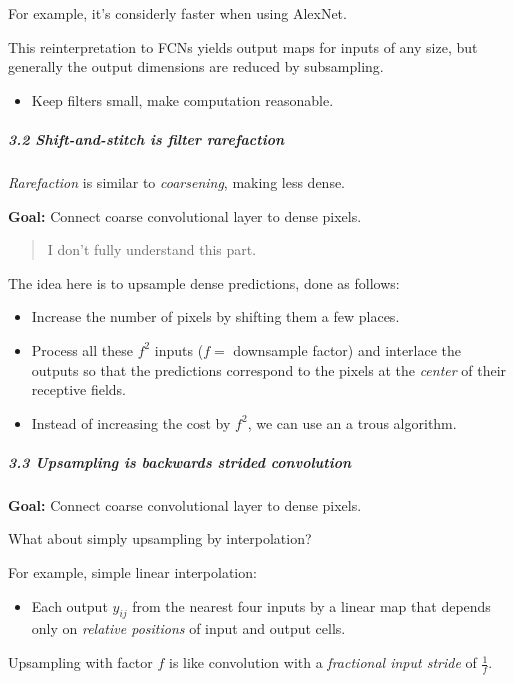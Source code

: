 \documentclass[]{article}
\let\oldsubparagraph\subparagraph
\renewcommand{\subparagraph}[1]{\oldsubparagraph{#1}\mbox{}}
\begin{document}
For example, it's considerly faster when using AlexNet.

This reinterpretation to FCNs yields output maps for inputs of any size,
but generally the output dimensions are reduced by subsampling.

\begin{itemize}
\item
  Keep filters small, make computation reasonable.
\end{itemize}

\subparagraph{3.2 Shift-and-stitch is filter
rarefaction}\label{header-n141}

\emph{Rarefaction} is similar to \emph{coarsening}, making less dense.

\textbf{Goal:} Connect coarse convolutional layer to dense pixels.

\begin{quote}
I don't fully understand this part.
\end{quote}

The idea here is to upsample dense predictions, done as follows:

\begin{itemize}
\item
  Increase the number of pixels by shifting them a few places.
\item
  Process all these \(f^2\) inputs (\(f =\) downsample factor) and
  interlace the outputs so that the predictions correspond to the pixels
  at the \emph{center} of their receptive fields.
\item
  Instead of increasing the cost by \(f^2\), we can use an a trous
  algorithm.
\end{itemize}

\subparagraph{3.3 Upsampling is backwards strided
convolution}\label{header-n161}

\textbf{Goal:} Connect coarse convolutional layer to dense pixels.

What about simply upsampling by interpolation?

For example, simple linear interpolation:

\begin{itemize}
\item
  Each output \(y_{ij}\) from the nearest four inputs by a linear map
  that depends only on \emph{relative positions} of input and output
  cells.
\end{itemize}

Upsampling with factor \(f\) is like convolution with a \emph{fractional
input stride} of \(\frac 1 f\).
\end{document}
